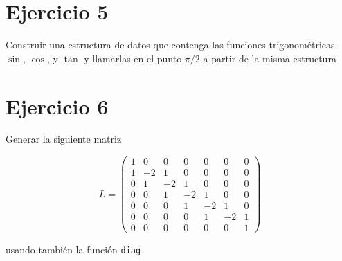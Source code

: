 \documentclass[a4]{article}
\begin{document}
\section*{Ejercicio 5}

Construir una estructura de datos que contenga las funciones
trigonométricas $\sin$, $\cos$, y $\tan$ y llamarlas en el punto
$\pi/2$ a partir de la misma estructura

\section*{Ejercicio 6}

Generar la siguiente matriz

\[
L = \left( \begin{array}{ccccccc}
1&0&0&0&0&0&0\\
1&-2&1&0&0&0&0\\
0&1&-2&1&0&0&0\\
0&0&1&-2&1&0&0\\
0&0&0&1&-2&1&0\\
0&0&0&0&1&-2&1\\
0&0&0&0&0&0&1
\end{array} \right)
\]

usando también la función \texttt{diag}
\end{document}
